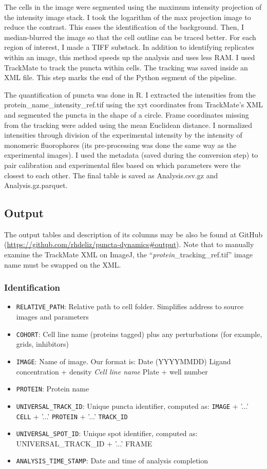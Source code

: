 The cells in the image were segmented using the maximum intensity projection of the intensity image stack. I took the logarithm of the max projection image to reduce the contrast. This eases the identification of the background. Then, I median-blurred the image so that the cell outline can be traced better. For each region of interest, I made a TIFF substack. In addition to identifying replicates within an image, this method speeds up the analysis and uses less RAM. I used TrackMate to track the puncta within cells. The tracking was saved inside an XML file. This step marks the end of the Python segment of the pipeline.

The quantification of puncta was done in R. I extracted the intensities from the protein\_name\_intensity\_ref.tif using the xyt coordinates from TrackMate’s XML and segmented the puncta in the shape of a circle. Frame coordinates missing from the tracking were added using the mean Euclidean distance. I normalized intensities through division of the experimental intensity by the intensity of monomeric fluorophores (its pre-processing was done the same way as the experimental images). I used the metadata (saved during the conversion step) to pair calibration and experimental files based on which parameters were the closest to each other. The final table is saved as Analysis.csv.gz and Analysis.gz.parquet.

\subsection{Output}
\label{section:output_tables}
The output tables and description of its columns may be also be found at GitHub (\url{https://github.com/rhdeliz/puncta-dynamics\#output}). Note that to manually examine the TrackMate XML on ImageJ, the “\emph{protein}\_tracking\_ref.tif” image name must be swapped on the XML.

\subsubsection{Identification}
\begin{itemize}
\item \texttt{RELATIVE\_PATH}: Relative path to cell folder. Simplifies address to source images and parameters
\item \texttt{COHORT}: Cell line name (proteins tagged) plus any perturbations (for example, grids, inhibitors)
\item \texttt{IMAGE}: Name of image. Our format is: Date (YYYYMMDD) Ligand concentration + density \emph{Cell line name} Plate + well number
\item \texttt{PROTEIN}: Protein name
\item \texttt{UNIVERSAL\_TRACK\_ID}: Unique puncta identifier, computed as: \texttt{IMAGE} + '...' \texttt{CELL} + '...' \texttt{PROTEIN} + '...' \texttt{TRACK\_ID}
\item \texttt{UNIVERSAL\_SPOT\_ID}: Unique spot identifier, computed as: UNIVERSAL\_TRACK\_ID + '...' FRAME
\item \texttt{ANALYSIS\_TIME\_STAMP}: Date and time of analysis completion
\end{itemize}

